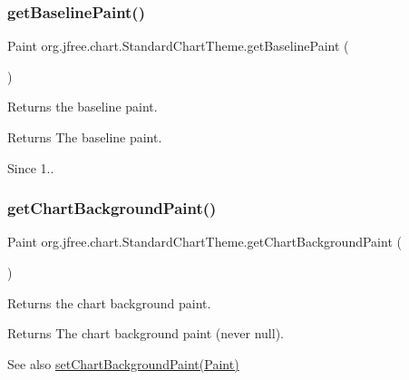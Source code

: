 \subsubsection{\texorpdfstring{get\+Baseline\+Paint()}{getBaselinePaint()}}
{\footnotesize\ttfamily Paint org.\+jfree.\+chart.\+Standard\+Chart\+Theme.\+get\+Baseline\+Paint (\begin{DoxyParamCaption}{ }\end{DoxyParamCaption})}

Returns the baseline paint.

\begin{DoxyReturn}{Returns}
The baseline paint.
\end{DoxyReturn}
\begin{DoxySince}{Since}
1.. 
\end{DoxySince}
\mbox{\label{classorg_1_1jfree_1_1chart_1_1_standard_chart_theme_a282a85722cb384c3a745c15e6ef5cf02}} 
\subsubsection{\texorpdfstring{get\+Chart\+Background\+Paint()}{getChartBackgroundPaint()}}
{\footnotesize\ttfamily Paint org.\+jfree.\+chart.\+Standard\+Chart\+Theme.\+get\+Chart\+Background\+Paint (\begin{DoxyParamCaption}{ }\end{DoxyParamCaption})}

Returns the chart background paint.

\begin{DoxyReturn}{Returns}
The chart background paint (never {\ttfamily null}).
\end{DoxyReturn}
\begin{DoxySeeAlso}{See also}
\mbox{\hyperlink{classorg_1_1jfree_1_1chart_1_1_standard_chart_theme_ad3c8891779ca58e4e3d22a9a2a5f84fa}{set\+Chart\+Background\+Paint(\+Paint)}} 
\end{DoxySeeAlso}
\mbox{\label{classorg_1_1jfree_1_1chart_1_1_standard_chart_theme_a61ddecaff890ba1c388ae21f883931d4}} 
